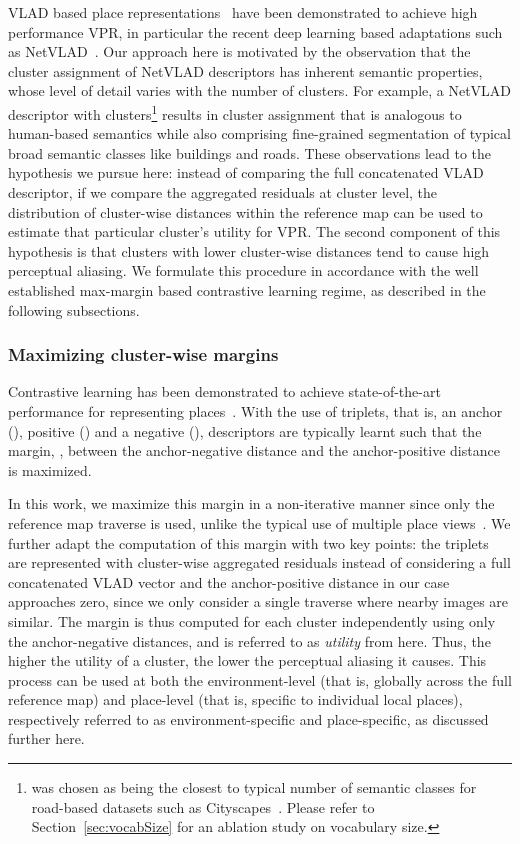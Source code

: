 \documentclass[letterpaper, 10 pt, conference]{ieeeconf}  \fi
\begin{document}
VLAD based place representations~\cite{jegou2010aggregating,torii201524,arandjelovic2016netvlad,garg2018lost} have been demonstrated to achieve high performance VPR, in particular the recent deep learning based adaptations such as NetVLAD~\cite{arandjelovic2016netvlad}. Our approach here is motivated by the observation that the cluster assignment of NetVLAD descriptors has inherent semantic properties, whose level of detail varies with the number of clusters. For example, a NetVLAD descriptor with  clusters\footnote{ was chosen as being the closest to typical number of semantic classes for road-based datasets such as Cityscapes~\cite{cordts2016cityscapes}. Please refer to Section~\ref{sec:vocabSize} for an ablation study on vocabulary size.} results in cluster assignment that is analogous to human-based semantics while also comprising fine-grained segmentation of typical broad semantic classes like buildings and roads. These observations lead to the hypothesis we pursue here: instead of comparing the full concatenated VLAD descriptor, if we compare the aggregated residuals at cluster level, the distribution of cluster-wise distances within the reference map can be used to estimate that particular cluster's utility for VPR. The second component of this hypothesis is that clusters with lower cluster-wise distances tend to cause high perceptual aliasing. We formulate this procedure in accordance with the well established max-margin based contrastive learning regime, as described in the following subsections.

\subsubsection{Maximizing cluster-wise margins}
Contrastive learning has been demonstrated to achieve state-of-the-art performance for representing places~\cite{arandjelovic2016netvlad,revaud2019learning,radenovic2018fine}. With the use of triplets, that is, an anchor (), positive () and a negative (), descriptors are typically learnt such that the margin, , between the anchor-negative distance and the anchor-positive distance is maximized. 


In this work, we maximize this margin in a non-iterative manner since only the reference map traverse is used, unlike the typical use of multiple place views~\cite{arandjelovic2016netvlad, revaud2019learning}. We further adapt the computation of this margin with two key points:  the triplets are represented with cluster-wise aggregated residuals instead of considering a full concatenated VLAD vector and  the anchor-positive distance in our case approaches zero, since we only consider a single traverse where nearby images are similar. The margin is thus computed for each cluster independently using only the anchor-negative distances, and is referred to as \textit{utility} from here. Thus, the higher the utility of a cluster, the lower the perceptual aliasing it causes. This process can be used at both the environment-level (that is, globally across the full reference map) and place-level (that is, specific to individual local places), respectively referred to as environment-specific and place-specific, as discussed further here.
\end{document}
